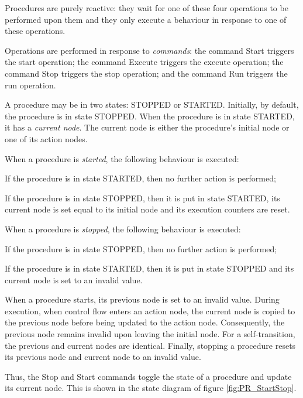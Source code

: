 Procedures are purely reactive: they wait for one of these four operations to be performed upon
them and they only execute a behaviour in response to one of these operations.

Operations are performed in response to \emph{commands}: the command Start triggers the start
operation; the command Execute triggers the execute operation; the command Stop triggers the
stop operation; and the command Run triggers the run operation.

A procedure may be in two states: STOPPED or STARTED. Initially, by default, the procedure
is in state STOPPED. When the procedure is in state STARTED, it has a \emph{current node}. The
current node is either the procedure's initial node or one of its action nodes.

When a procedure is \emph{started}, the following behaviour is executed:
\begin{fw_enumerate}
\item If the procedure is in state STARTED, then no further action is performed;
\item If the procedure is in state STOPPED, then it is put in state STARTED, its current
node is set equal to its initial node and its execution counters are reset.
\end{fw_enumerate}

When a procedure is \emph{stopped}, the following behaviour is executed:

\begin{fw_enumerate}
\item If the procedure is in state STOPPED, then no further action is performed;
\item If the procedure is in state STARTED, then it is put in state STOPPED and its current
node is set to an invalid value.
\end{fw_enumerate}

When a procedure starts, its previous node is set to an invalid value. During execution,
when control flow enters an action node, the current node is copied to the previous node
before being updated to the action node. Consequently, the previous node remains invalid
upon leaving the initial node. For a self-transition, the previous and current nodes are
identical. Finally, stopping a procedure resets its previous node and current node to an
invalid value.

Thus, the Stop and Start commands toggle the state of a procedure and update its current node.
This is shown in the state diagram of figure \ref{fig:PR_StartStop}.

